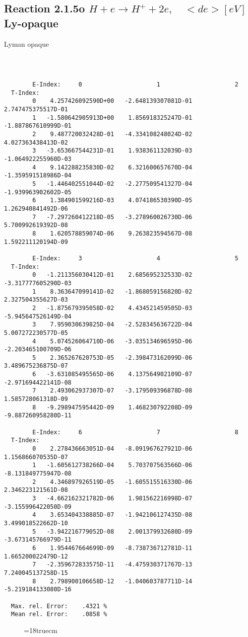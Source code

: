 \subsection{
Reaction 2.1.5o  $ H + e \rightarrow H^+ + 2e, \quad  <de>  [eV]$ Ly-opaque}

Lyman opaque

\begin{verbatim}



        E-Index:     0                     1                     2
  T-Index:
        0    4.257426092590D+00   -2.648139307081D-01    2.747475375517D-01
        1   -1.580642905913D+00    1.856918325247D-01   -1.887867610999D-01
        2    9.487720032428D-01   -4.334108248024D-02    4.027363438413D-02
        3   -3.653667544231D-01    1.938361132039D-03   -1.064922255960D-03
        4    9.142288235830D-02    6.321600657670D-04   -1.359591518986D-04
        5   -1.446402551044D-02   -2.277509541327D-04   -1.939963902602D-05
        6    1.384901599216D-03    4.074186530390D-05    1.262940841492D-06
        7   -7.297260412218D-05   -3.278960026730D-06    5.700992619392D-08
        8    1.620578859074D-06    9.263823594567D-08    1.592211120194D-09

        E-Index:     3                     4                     5
  T-Index:
        0   -1.211356030412D-01    2.685695232533D-02   -3.317777605290D-03
        1    8.363647099141D-02   -1.868059156820D-02    2.327504355627D-03
        2   -1.875679395058D-02    4.434521459505D-03   -5.945647526149D-04
        3    7.959030639825D-04   -2.528345636722D-04    5.007272230577D-05
        4    5.074526064710D-06   -3.035134696595D-06   -2.203465100709D-06
        5    2.365267620753D-05   -2.398473162099D-06    3.489675236875D-07
        6   -3.631085495565D-06    4.137564902109D-07   -2.971694422141D-08
        7    2.493062937307D-07   -3.179509396878D-08    1.585728061318D-09
        8   -9.298947595442D-09    1.468230792208D-09   -9.887260958280D-11

        E-Index:     6                     7                     8
  T-Index:
        0    2.278436663051D-04   -8.091967627921D-06    1.156866070535D-07
        1   -1.605612738266D-04    5.703707563566D-06   -8.131849775947D-08
        2    4.346897926519D-05   -1.605515516330D-06    2.346223121561D-08
        3   -4.662162321782D-06    1.981562216998D-07   -3.155996422050D-09
        4    3.653404338885D-07   -1.942106127435D-08    3.499018522662D-10
        5   -3.942216779052D-08    2.001379932680D-09   -3.673145766979D-11
        6    1.954467664699D-09   -8.738736712781D-11    1.665200022479D-12
        7   -2.359672833575D-11   -4.475930371767D-13    7.240045137258D-15
        8    2.798900106658D-12   -1.040603787711D-14   -5.219184133080D-16

  Max. rel. Error:    .4321 %
  Mean rel. Error:    .0858 %

\end{verbatim}
\begin{figure} \label{2.1.5li2o}
\epsfxsize=18truecm
\end{figure}
\newpage

